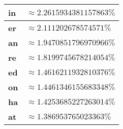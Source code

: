 \documentclass{article}
\begin{document}
\begin{enumerate}[label=(\alph*)]
\begin{center}
\begin{tabular}{ll}
        \textbf{in} & $\approx 2.2615934381157863\%$ \\ \hline
        \textbf{er} & $\approx 2.111202678574571\%$ \\ \hline
        \textbf{an} & $\approx 1.9470851796970966\%$ \\ \hline
        \textbf{re} & $\approx 1.8199745678214054\%$ \\ \hline
        \textbf{ed} & $\approx 1.4616211932810376\%$ \\ \hline
        \textbf{on} & $\approx 1.4461346155683348\%$ \\ \hline
        \textbf{ha} & $\approx 1.4253685227263014\%$ \\ \hline
        \textbf{at} & $\approx 1.386953765023363\%$ \\ \hline
    \end{tabular}
    \end{center}
\end{enumerate}
\end{document}
